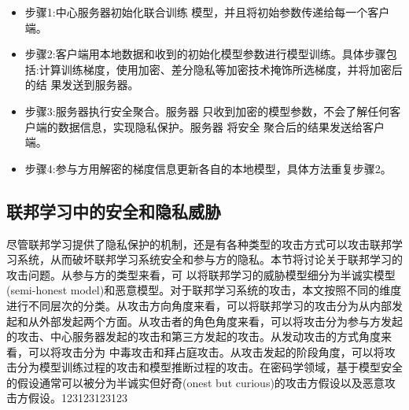 \begin{itemize}
\item 步骤1:中心服务器初始化联合训练 模型，并且将初始参数传递给每一个客户端。
\item 步骤2:客户端用本地数据和收到的初始化模型参数进行模型训练。具体步骤包括:计算训练梯度，使用加密、差分隐私等加密技术掩饰所选梯度，并将加密后的结 果发送到服务器。
\item 步骤3:服务器执行安全聚合。服务器 只收到加密的模型参数，不会了解任何客 户端的数据信息，实现隐私保护。服务器 将安全 聚合后的结果发送给客户端。
\item 步骤4:参与方用解密的梯度信息更新各自的本地模型，具体方法重复步骤2。
\end{itemize}

\subsection{联邦学习中的安全和隐私威胁}
尽管联邦学习提供了隐私保护的机制，还是有各种类型的攻击方式可以攻击联邦学习系统，从而破坏联邦学习系统安全和参与方的隐私。本节将讨论关于联邦学习的攻击问题。从参与方的类型来看，可 以将联邦学习的威胁模型细分为半诚实模型 (semi-honest model)和恶意模型。对于联邦学习系统的攻击，本文按照不同的维度进行不同层次的分类。从攻击方向角度来看，可以将联邦学习的攻击分为从内部发起和从外部发起两个方面。从攻击者的角色角度来看，可以将攻击分为参与方发起的攻击、中心服务器发起的攻击和第三方发起的攻击。从发动攻击的方式角度来看，可以将攻击分为 中毒攻击和拜占庭攻击。从攻击发起的阶段角度，可以将攻击分为模型训练过程的攻击和模型推断过程的攻击。在密码学领域，基于模型安全的假设通常可以被分为半诚实但好奇(onest but curious)的攻击方假设以及恶意攻击方假设。123123123123

